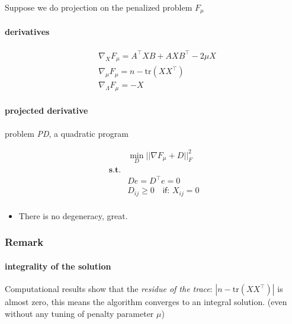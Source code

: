 \documentclass[
  10pt,
  a4paper,
,tablecaptionabove
]{scrartcl}
\providecommand{\tightlist}{%
  \setlength{\itemsep}{0pt}\setlength{\parskip}{0pt}}
\begin{document}
Suppose we do projection on the penalized problem \(F_\mu\)

\hypertarget{derivatives}{%
\paragraph{derivatives}\label{derivatives}}

\[\begin{aligned}
& \nabla_X F_\mu  = A^\top XB + AXB^\top - 2\mu X \\
& \nabla_\mu F_\mu  = n - \textrm{tr}(XX^\top) \\
& \nabla_\Lambda F_\mu  = - X
\end{aligned}\]

\hypertarget{projected-derivative}{%
\paragraph{projected derivative}\label{projected-derivative}}

problem \emph{PD}, a quadratic program

\[\begin{aligned}
&\min_D ||\nabla F_\mu + D ||_F^2  \\
\mathbf{s.t.} & \\
&D e = D^\top e = 0 \\ 
&D_{ij} \ge 0 \quad \textsf{if: } X_{ij} = 0\\
\end{aligned}\]

\begin{itemize}
\tightlist
\item
  There is no degeneracy, great.
\end{itemize}

\hypertarget{remark}{%
\subsubsection{Remark}\label{remark}}

\hypertarget{integrality-of-the-solution}{%
\paragraph{integrality of the
solution}\label{integrality-of-the-solution}}

Computational results show that the \emph{residue of the trace}:
\(|n - \textrm{tr}(XX^\top)|\) is almost zero, this means the algorithm
converges to an integral solution. (even without any tuning of penalty
parameter \(\mu\))
\end{document}
